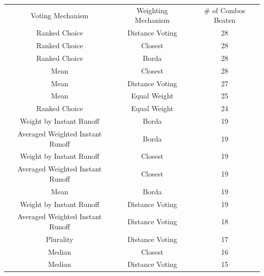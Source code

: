 \begin{table}[htbp]
    \centering
    \begin{tabular}{|c|c|c|}
        \hline
        Voting Mechanism                 & Weighting Mechanism & \# of Combos Beaten \\
        \hhline{|=|=|=|}
        Ranked Choice                    & Distance Voting     & 28                  \\
        \hline
        Ranked Choice                    & Closest             & 28                  \\
        \hline
        Ranked Choice                    & Borda               & 28                  \\
        \hline
        Mean                             & Closest             & 28                  \\
        \hline
        Mean                             & Distance Voting     & 27                  \\
        \hline
        Mean                             & Equal Weight        & 25                  \\
        \hline
        Ranked Choice                    & Equal Weight        & 24                  \\
        \hline
        Weight by Instant Runoff         & Borda               & 19                  \\
        \hline
        Averaged Weighted Instant Runoff & Borda               & 19                  \\
        \hline
        Weight by Instant Runoff         & Closest             & 19                  \\
        \hline
        Averaged Weighted Instant Runoff & Closest             & 19                  \\
        \hline
        Mean                             & Borda               & 19                  \\
        \hline
        Weight by Instant Runoff         & Distance Voting     & 19                  \\
        \hline
        Averaged Weighted Instant Runoff & Distance Voting     & 18                  \\
        \hline
        Plurality                        & Distance Voting     & 17                  \\
        \hline
        Median                           & Closest             & 16                  \\
        \hline
        Median                           & Distance Voting     & 15                  \\

\end{tabular}
\end{table}
